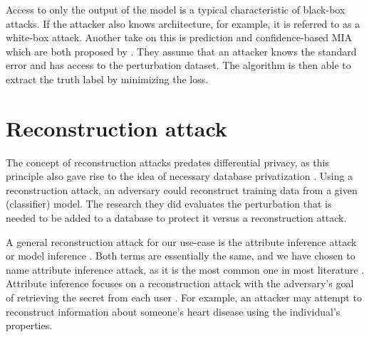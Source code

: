 Access to only the output of the model is a typical characteristic of black-box attacks. If the attacker also knows architecture, for example, it is referred to as a white-box attack.
Another take on this is prediction and confidence-based MIA which are both proposed by \citep{yeom_privacy_2018}.
They assume that an attacker knows the standard error and has access to the perturbation dataset.
The algorithm is then able to extract the truth label by minimizing the loss. \newline






\newpage
\section{Reconstruction attack}
The concept of reconstruction attacks predates differential privacy, as this principle also gave rise to the idea of necessary database privatization \citep{dinur_revealing_2003}.
Using a reconstruction attack, an adversary could reconstruct training data from a given (classifier) model.
The research they did evaluates the perturbation that is needed to be added to a database to protect it versus a reconstruction attack.

A general reconstruction attack for our use-case is the attribute inference attack \citep{dwork_exposed_2017} or model inference \citep{rigaki_survey_2021}.
Both terms are essentially the same, and we have chosen to name attribute inference attack, as it is the most common one in most literature \citep{jegorova_survey_2022}.
Attribute inference focuses on a reconstruction attack with the adversary's goal of retrieving the secret from each user \citep{dwork_exposed_2017}.
For example, an attacker may attempt to reconstruct information about someone's heart disease using the individual's properties.

